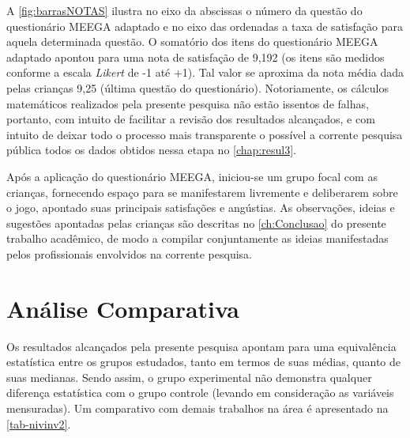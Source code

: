 A \autoref{fig:barrasNOTAS} ilustra no eixo da abscissas o número da questão do questionário \ac{MEEGA} adaptado e no eixo das ordenadas a taxa de satisfação para aquela determinada questão. O somatório dos itens do questionário \ac{MEEGA} adaptado apontou para uma nota de satisfação de 9,192 (os itens são medidos conforme a escala \textit{Likert} de -1 até +1). Tal valor se aproxima da nota média dada pelas crianças 9,25 (última questão do questionário). Notoriamente, os cálculos matemáticos realizados pela presente pesquisa não estão issentos de falhas, portanto, com intuito de facilitar a revisão dos resultados alcançados, e com intuito de deixar todo o processo mais transparente o possível a corrente pesquisa pública todos os dados obtidos nessa etapa no \autoref{chap:resul3}.

Após a aplicação do questionário \ac{MEEGA}, iniciou-se um grupo focal com as crianças, fornecendo espaço para se manifestarem livremente e deliberarem sobre o jogo, apontado suas principais satisfações e angústias. As observações, ideias e sugestões apontadas pelas crianças são descritas no \autoref{ch:Conclusao} do presente trabalho acadêmico, de modo a compilar conjuntamente as ideias manifestadas pelos profissionais envolvidos na corrente pesquisa.



\section{Análise Comparativa}\label{sec:compilar}

Os resultados alcançados pela presente pesquisa apontam para uma equivalência estatística entre os grupos estudados, tanto em termos de suas médias, quanto de suas medianas. Sendo assim, o grupo experimental não demonstra qualquer diferença estatística com o grupo controle (levando em consideração as variáveis mensuradas). Um comparativo com demais trabalhos na área é apresentado na \autoref{tab-nivinv2}.

